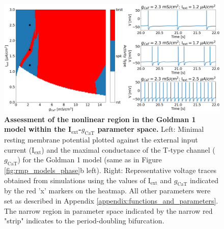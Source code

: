 \documentclass[../main.tex]{subfiles}
\begin{document}
\color{red}




\color{black}

\begin{figure}[!t]
    \centering
    \includegraphics[width=\linewidth]{../img/rmp/nonlinearity_rmp.png}
    \caption[Assessment of the nonlinear region in the Goldman 1 model within the I$_{\text{ext}}$-$g_{\text{CaT}}$ parameter space]{
        \textbf{Assessment of the nonlinear region in the Goldman 1 model within the I$_{\text{ext}}$-$g_{\text{CaT}}$ parameter space.} Left: Minimal resting membrane potential plotted against the external input current (I$_{\text{ext}}$) and the maximal conductance of the T-type channel ($g_{\text{CaT}}$) for the Goldman 1 model (same as in Figure \ref{fig:rmp_models_phase}b left). Right:  Representative voltage traces obtained from simulations using the values of I$_{\text{ext}}$ and $g_{\text{CaT}}$ indicated by the red 'x' markers on the heatmap. All other parameters were set as described in Appendix \ref{appendix:functions_and_parameters}. The narrow region in parameter space indicated by the narrow red "strip" indicates to the period-doubling bifurcation.
    }
    \label{fig:nonlinearity_rmp}
\end{figure}
    
\end{document}
